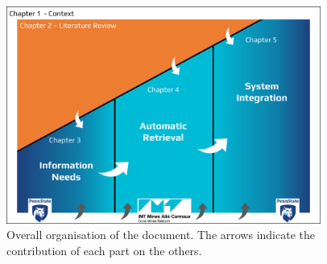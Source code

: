 \begin{figure}[h]
    \centering
    \includegraphics[width=0.92\textwidth,keepaspectratio]{figures/chap-0/big-picture.pdf}
    \caption{Overall organisation of the document. The arrows indicate the contribution of each part on the others.}
    \label{introduction:big-picture}
\end{figure}

